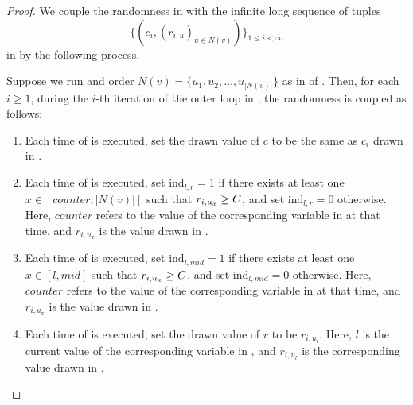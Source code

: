 \begin{proof}%
We couple the randomness in  with the infinite long sequence of tuples 
$$\{(c_i,(r_{i,u})_{u\in N(v)})\}_{1\leq i<\infty}$$ 
in  by the following process. 

\begin{definition}\label{definition:process-couple}
Suppose we run  and order $N(v)=\{u_1,u_2,\dots,u_{|N(v)|}\}$ as in  of . Then, for each $i\geq 1$, during the $i$-th iteration of the outer loop in ,
the randomness is coupled as follows:
\begin{enumerate}
        \item  Each time  of  is executed, set the drawn value of $c$  to be the same as $c_i$ drawn in . \label{item:eval-efficient-coupling-1}
        \item Each time  of  is executed, set $\textrm{ind}_{l,r}=1$  if there exists at least one $x\in [counter,|N(v)|]$ such that $r_{i,u_x}\geq C$, and set $\textrm{ind}_{l,r}=0$ otherwise. Here, $counter$  refers to the value of the corresponding variable in  at that time, and $r_{i,u_x}$ is the value drawn in .  \label{item:eval-efficient-coupling-2}
        \item Each time  of  is executed, set $\textrm{ind}_{l,mid}=1$ if there exists at least one $x\in [l,mid]$ such that $r_{i,u_x}\geq C$, and set $\textrm{ind}_{l,mid}=0$ otherwise. Here, $counter$ refers to the value of the corresponding variable in  at that time, and $r_{i,u_x}$ is the value drawn in .  \label{item:eval-efficient-coupling-3}
        \item  Each time  of  is executed, set the drawn value of $r$ to be $r_{i,u_l}$. Here, $l$ is the current value of the corresponding variable in , and $r_{i,u_l}$ is the corresponding value drawn in . \label{item:eval-efficient-coupling-4}
\end{enumerate}
\end{definition}


\end{proof}
